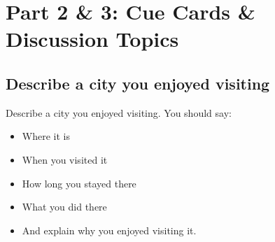 \chapter{Part 2 \& 3: Cue Cards \& Discussion Topics}

\section{Describe a city you enjoyed visiting}
\begin{ieltsprompt}
Describe a city you enjoyed visiting.
You should say:
\begin{itemize}[leftmargin=2em, itemsep=2pt]
\item Where it is
\item When you visited it
\item How long you stayed there
\item What you did there
\item And explain why you enjoyed visiting it.
\end{itemize}
\end{ieltsprompt}
